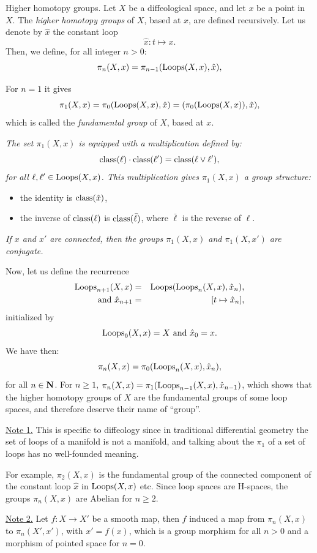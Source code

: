 \begin{Article}{Higher homotopy groups.}{}
  \label{Higher-homotopy-groups}
  Let $X$ be a diffeological space,
  and let $x$ be a point in $X$.
  The \emph{higher homotopy groups} of $X$,
  based at $x$,
  are defined recursively.
  Let us denote by $\hat x$ the constant loop
  $$%
   \hat x \colon t \mapsto x.
  $$%
  Then,
  we define,
  for all integer $n > 0$:
  $$%
  \pi_n(X,x) = \pi_{n-1}(\Loops(X,x), \hat x),
  $$%

  For $n=1$ it gives
  $$%
  \pi_1(X,x) = \pi_0(\Loops(X,x), \hat x) = (\pi_0(\Loops(X,x)), \hat x),
  $$%
  which is called the \emph{fundamental group} of $X$, based at $x$.

   {\itshape The set $\pi_1(X,x)$ is equipped with a multiplication defined by:
  $$%
   \Class(\ell) \cdot \Class(\ell') = \Class(\ell \vee \ell'),
  $$%
  for all $\ell,\ell' \in \operatorname{Loops}(X,x)$.
  This multiplication gives $\pi_1(X,x)$ a group structure:
  \begin{itemize}
  \item[a)] the identity is $\operatorname{class}(\hat x)$,
  \item[b)] the inverse of $\operatorname{class}(\ell)$ is $\operatorname{class}(\bar \ell)$,
  where $\bar \ell$ is the reverse of $\ell$.
  \end{itemize}
  }

   {\itshape If $x$ and $x'$ are connected,
  then the groups $\pi_1(X,x)$ and $\pi_1(X,x')$ are conjugate.}

  Now, let us define the recurrence
  \begin{eqnarray*}
  \operatorname{Loops}_{n+1}(X,x) & = & \operatorname{Loops}(\operatorname{Loops}_n(X,x), \hat x_n), \\
  \ \text{and}\ 
  \hat x_{n+1} & = & [t \mapsto \hat x_n],
  \end{eqnarray*}
  initialized by
  $$%
  \Loops_0(X,x) = X
  \SpacedText{and}
  \hat x_0 = x.
  $$%
  We have then:
  $$%
  \pi_n(X,x) = \pi_0(\Loops_n(X,x), \hat x_n),
  $$%
  for all $n \in \mathbf{N}$.
  For $n \geq 1$,
  $\pi_n(X,x) = \pi_1(\operatorname{Loops}_{n-1}(X,x), \hat x_{n-1})$,
  which shows that the higher homotopy groups of $X$ are the fundamental groups of some loop spaces,
  and therefore deserve their name of ``group''.

  \uline{Note 1.} This is specific to diffeology since in traditional differential geometry the set of loops of a manifold is not a manifold,
  and talking about the $\pi_1$ of a set of loops has no well-founded meaning.

  For example,
  $\pi_2(X,x)$ is the fundamental group of the connected component of the constant loop $\hat x$ in $\operatorname{Loops}(X,x)$ etc.
  Since loop spaces are H-spaces,
  the groups $\pi_n(X,x)$ are Abelian for $n \geq 2$.

  \uline{Note 2.} Let $f \colon X \to X'$ be a smooth map,
  then $f$ induced a map from $\pi_n(X,x)$ to $\pi_n(X',x')$,
  with $x' = f(x)$,
  which is a group morphism for all $n > 0$ and a morphism of pointed space for $n = 0$.
\end{Article}

